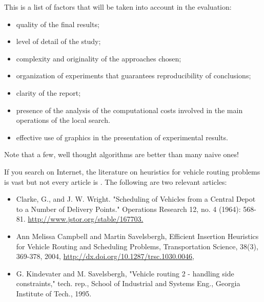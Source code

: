 \begin{remarks} 


\item This is a list of factors that will be taken into account in the
evaluation:


\begin{itemize} 
\item quality of the final results;
\item level of detail of the study;
\item complexity and originality of the approaches chosen;

\item organization of experiments that guarantees reproducibility of
  conclusions;
\item clarity of the report;
\item presence of the analysis of the computational costs involved in
  the main operations of the local search.

\item effective use of graphics in the presentation of experimental results.
\end{itemize}


\item 
Note that a few, well thought algorithms are better than many naive ones!


\color{red}

\item If you search on Internet, the literature on heuristics for
  vehicle routing problems is vast but not every article is . The following are two relevant
  articles:


\begin{itemize}


\item Clarke, G., and J. W. Wright. "Scheduling of Vehicles from a
  Central Depot to a Number of Delivery Points." Operations Research 12,
  no. 4 (1964): 568-81. \url{http://www.jstor.org/stable/167703.}

\item Ann Melissa Campbell and Martin Savelsbergh, Efficient Insertion
  Heuristics for Vehicle Routing and Scheduling Problems, Transportation Science,
38(3), 369-378, 2004, \url{http://dx.doi.org/10.1287/trsc.1030.0046},

  
\item G. Kindevater and M. Savelsbergh, "Vehicle routing 2 - handling
  side constraints," tech. rep., School of Industrial and Systems Eng.,
  Georgia Institute of Tech., 1995.

  
\end{itemize}

\end{remarks}



